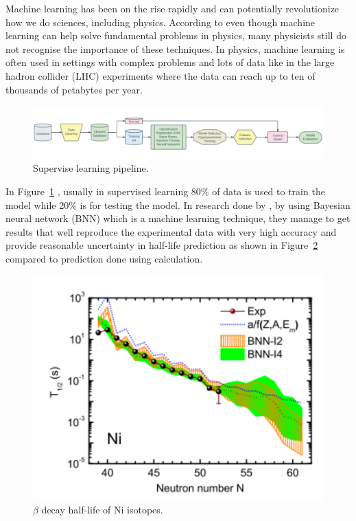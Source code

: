 Machine learning has been on the rise rapidly and can potentially revolutionize how we do sciences, including physics. According to  even though machine learning can help solve fundamental problems in physics, many physicists still do not recognise the importance of these techniques. In physics, machine learning is often used in settings with complex problems and lots of data like in the large hadron collider (LHC) experiments where the data can reach up to ten of thousands of petabytes per year. 

\begin{figure}[H]
	\centering
	\includegraphics[width=\textwidth]{assets/SLpipe.png}
	\caption{Supervise learning pipeline.}
	\label{fig:SLP}
\end{figure}

In Figure~\ref{fig:SLP} , usually in supervised learning 80\% of data is used to train the model while 20\% is for testing the model.
In research done by , by using Bayesian neural network (BNN) which is a machine learning technique, they manage to get results that well reproduce the experimental data with very high accuracy and provide reasonable uncertainty in half-life prediction as shown in Figure~\ref{fig:NNcon} compared to prediction done using calculation.  
\begin{figure}[H]
	\centering
	\includegraphics[width=\textwidth]{assets/NNcon.png}
	\caption{$\beta$ decay half-life of Ni isotopes.}
	\label{fig:NNcon}
\end{figure}

